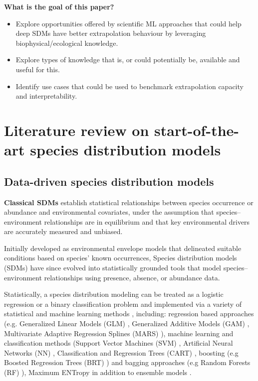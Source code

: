 \noindent\textbf{What is the goal of this paper?} 
\begin{itemize}
    \item Explore opportunities offered by scientific ML approaches that could help deep SDMs have better extrapolation behaviour by leveraging biophysical/ecological knowledge.
    \item Explore types of knowledge that is, or could potentially be, available and useful for this.
    \item Identify use cases that could be used to benchmark extrapolation capacity and interpretability.
\end{itemize}

\section{Literature review on start-of-the-art species distribution models}

\subsection{Data-driven species distribution models}
\noindent\textbf{Classical SDMs}
 establish statistical relationships between species occurrence or abundance and environmental covariates, under the assumption that species–environment relationships are in equilibrium and that key environmental drivers are accurately measured and unbiased. 

Initially developed as environmental envelope models that delineated suitable conditions based on species’ known occurrences, Species distribution models (SDMs) have since evolved into statistically grounded tools that model species–environment relationships using presence, absence, or abundance data. 

Statistically, a species distribution modeling can be treated as a logistic regression or a binary classification problem and implemented via a variety of statistical and machine learning methods \cite{guisan2017habitat}, including: regression based approaches (e.g. Generalized Linear Models (GLM) \cite{nelder1972generalized}, Generalized Additive Models (GAM) \cite{hastie1986generalized}, Multivariate Adaptive Regression
Splines (MARS) \cite{friedman1991multivariate}), machine learning and classification methods (Support Vector
Machines (SVM) \cite{hearst1998support}, Artificial Neural Networks (NN) \cite{lecun2015deep}, Classification
and Regression Trees (CART) \cite{breiman2017classification}, boosting (e.g Boosted Regression Trees (BRT) \cite{elith2008working}) and bagging approaches (e.g Random Forests (RF) \cite{breiman2001random}), Maximum ENTropy \cite{phillips2017opening} in addition to ensemble models \cite{thuiller2009biomod}. 

